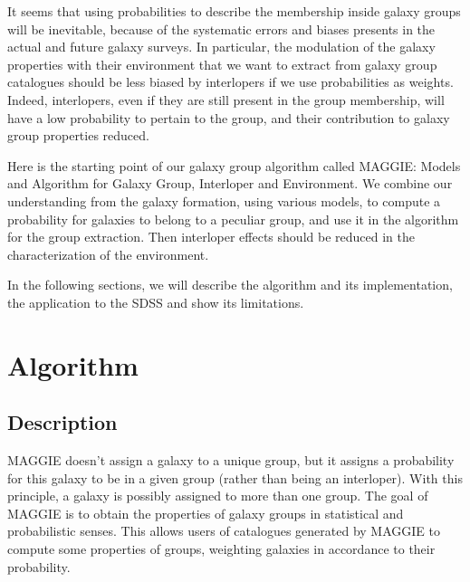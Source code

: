 It seems that using probabilities to describe the membership inside galaxy
groups will be inevitable, because of the systematic errors and biases presents
in the actual and future galaxy surveys. In particular, the modulation of the
galaxy properties with their environment that we want to extract from galaxy
group catalogues should be less biased by interlopers if we use probabilities
as weights. Indeed, interlopers, even if they are still present in the group
membership, will have a low probability to pertain to the group, and their
contribution to galaxy group properties reduced.

Here is the starting point of our galaxy group algorithm called MAGGIE\@:
Models and Algorithm for Galaxy Group, Interloper and Environment. We combine
our understanding from the galaxy formation, using various models, to compute a
probability for galaxies to belong to a peculiar group, and use it in the
algorithm for the group extraction. Then interloper effects should be reduced
in the characterization of the environment.

In the following sections, we will describe the algorithm and its
implementation, the application to the SDSS and show its limitations.

\section{Algorithm}
\label{sec:algorithm}

\subsection{Description}
\label{sub:maggie_description}

MAGGIE doesn't assign a galaxy to a unique group, but it assigns a probability
for this galaxy to be in a given group (rather than being an interloper). With
this principle, a galaxy is possibly assigned to more than one group. The goal
of MAGGIE is to obtain the properties of galaxy groups in statistical and
probabilistic senses. This allows users of catalogues generated by MAGGIE to
compute some properties of groups, weighting galaxies in accordance to their
probability.

